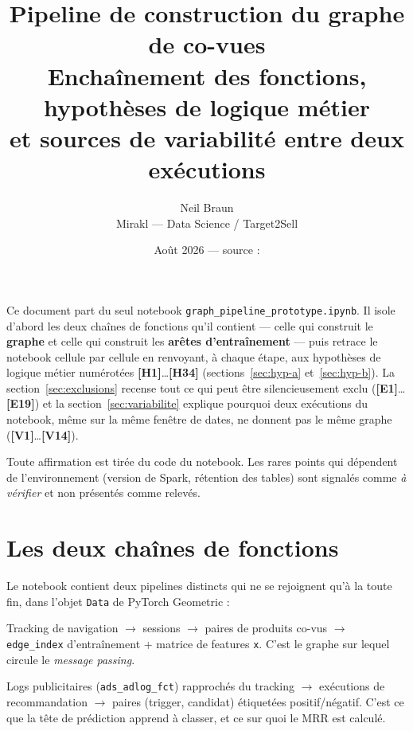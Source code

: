 \documentclass[11pt,a4paper]{article}
\title{\vspace{-1.6cm}\textbf{Pipeline de construction du graphe de co-vues}\\[0.25cm]
\large Enchaînement des fonctions, hypothèses de logique métier\\
et sources de variabilité entre deux exécutions}
\author{Neil Braun\\[0.15cm]
\small Mirakl --- Data Science / Target2Sell}
\date{\small Août 2026 --- source : \code{graph\_pipeline\_prototype.ipynb}}
\newcommand{\code}[1]{\texttt{\small #1}}
\newcommand{\hyp}[1]{\textcolor{hypcol}{\textbf{\small [#1]}}}
\begin{document}
\maketitle

\noindent
Ce document part du seul notebook \code{graph\_pipeline\_prototype.ipynb}. Il isole
d'abord les deux chaînes de fonctions qu'il contient --- celle qui construit le
\textbf{graphe} et celle qui construit les \textbf{arêtes d'entraînement} --- puis
retrace le notebook cellule par cellule en renvoyant, à chaque étape, aux hypothèses
de logique métier numérotées \hyp{H1}\dots\hyp{H34} (sections~\ref{sec:hyp-a}
et~\ref{sec:hyp-b}). La section~\ref{sec:exclusions} recense tout ce qui peut être
silencieusement exclu (\hyp{E1}\dots\hyp{E19}) et la section~\ref{sec:variabilite}
explique pourquoi deux exécutions du notebook, même sur la même fenêtre de dates,
ne donnent pas le même graphe (\hyp{V1}\dots\hyp{V14}).

\medskip
\noindent
Toute affirmation est tirée du code du notebook. Les rares points qui dépendent de
l'environnement (version de Spark, rétention des tables) sont signalés comme
\emph{à vérifier} et non présentés comme relevés.

\tableofcontents

\section{Les deux chaînes de fonctions}

Le notebook contient deux pipelines distincts qui ne se rejoignent qu'à la toute
fin, dans l'objet \code{Data} de PyTorch Geometric :

\begin{description}[leftmargin=1.1cm,style=nextline,font=\normalfont\itshape]
  \item[Chaîne A --- le graphe.] Tracking de navigation $\rightarrow$ sessions
        $\rightarrow$ paires de produits co-vus $\rightarrow$ \code{edge\_index}
        d'entraînement + matrice de features \code{x}. C'est le graphe sur lequel
        circule le \emph{message passing}.
  \item[Chaîne B --- les arêtes d'entraînement.] Logs publicitaires
        (\code{ads\_adlog\_fct}) rapprochés du tracking $\rightarrow$ exécutions de
        recommandation $\rightarrow$ paires (trigger, candidat) étiquetées
        positif/négatif. C'est ce que la tête de prédiction apprend à classer, et ce
        sur quoi le MRR est calculé.
\end{description}
\end{document}
